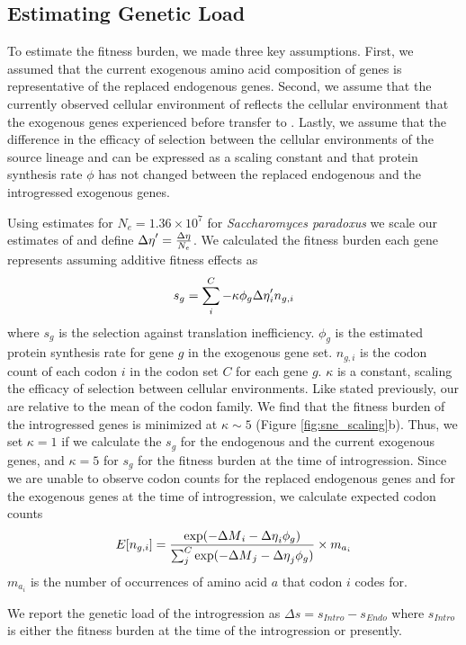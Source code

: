 \documentclass[12pt]{article}
\begin{document}
\subsection*{Estimating Genetic Load}

To estimate the fitness burden, we made three key assumptions.
First, we assumed that the current exogenous amino acid composition of genes is representative of the replaced endogenous genes.
Second, we assume that the currently observed cellular environment of \gossypii reflects the cellular environment that the exogenous genes experienced before transfer to \kluyveri.
Lastly, we assume that the difference in the efficacy of selection between the cellular environments of the source lineage and \kluyveri can be expressed as a scaling constant and that protein synthesis rate $\phi$ has not changed between the replaced endogenous and the introgressed exogenous genes.

Using estimates for $N_e = 1.36\times10^7$ \citep{wagner2005} for \textit{Saccharomyces paradoxus} we scale our estimates of \DE and define ${\Delta \eta}' = \frac{{\Delta \eta}}{N_e}$.
We calculated the fitness burden each gene represents assuming additive fitness effects as 
\begin{equation}
s_g = \sum_i^{C} -\kappa \phi_g {\Delta \eta}'_i n_{g,i} 
\end{equation}
where $s_g$ is the selection against translation inefficiency.
$\phi_g$ is the estimated protein synthesis rate for gene $g$ in the exogenous gene set.
$n_{g,i}$ is the codon count of each codon $i$ in the codon set $C$ for each gene $g$.
$\kappa$ is a constant, scaling the efficacy of selection between cellular environments.
Like stated previously, our \DE are relative to the mean of the codon family.
We find that the fitness burden of the introgressed genes  is minimized at $\kappa \sim 5$ (Figure \ref{fig:sne_scaling}b).
Thus, we set $\kappa = 1$ if we calculate the $s_g$ for the endogenous and the current exogenous genes, and $\kappa = 5$ for $s_g$ for the fitness burden at the time of introgression.
Since we are unable to observe codon counts for the replaced endogenous genes and for the exogenous genes at the time of introgression, we calculate expected codon counts
\begin{equation}
E[n_{g,i}] = \frac{\exp(-{\Delta M}_i -{\Delta \eta}_i\phi_g)}{\sum_j^C \exp(-{\Delta M}_j -{\Delta \eta}_j\phi_g)}\times m_{a_i}
\end{equation} 
$m_{a_i}$ is the number of occurrences of amino acid $a$ that codon $i$ codes for.

We report the genetic load of the introgression as $\Delta s = s_{Intro} - s_{Endo}$ where $s_{Intro}$ is either the fitness burden at the time of the introgression or presently.
\end{document}
